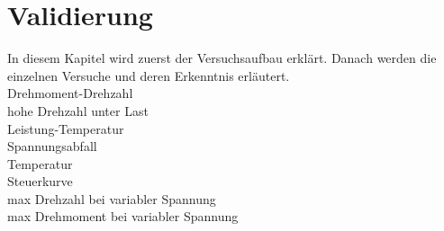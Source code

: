 \section{Validierung}\label{sec:Validierung}
In diesem Kapitel wird zuerst der Versuchsaufbau erklärt. Danach werden die einzelnen Versuche und deren Erkenntnis erläutert.\\
Drehmoment-Drehzahl\\
hohe Drehzahl unter Last\\
Leistung-Temperatur\\
Spannungsabfall\\
Temperatur\\
Steuerkurve\\
max Drehzahl bei variabler Spannung\\
max Drehmoment bei variabler Spannung\\










